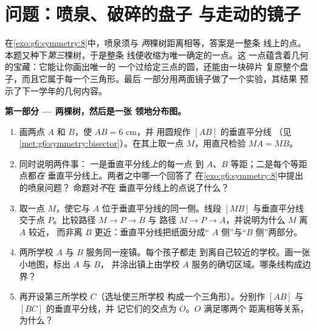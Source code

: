\section{问题：喷泉、破碎的盘子
与走动的镜子}

\begin{problem}
\label{pb:g6:symmetry:1}
在\cref{exo:g6:symmetry:8}中，喷泉须与
\emph{两}棵树距离相等，答案是一整条
线上的点。本题又种下\emph{第三}棵树，于是整条
线便收缩为唯一确定的一点。这
一点蕴含着几何的宝藏：它能让你画出唯一的
一个过给定三点的圆，还能由一块碎片
复原整个盘子，而且它属于每一个三角形。最后
一部分用两面镜子做了一个实验，其结果
预示了下一学年的几何内容。

\medskip
\noindent\textbf{第一部分 --- 两棵树，然后是一张
领地分布图。}
\begin{enumerate}
  \item 画两点 $A$ 和 $B$，使 $AB = 6$ cm，并
        用圆规作 $[AB]$ 的垂直平分线
        （见\cref{met:g6:symmetry:bisector}）。在其上取一点
        $M$，用直尺检验 $MA = MB$。
  \item {}同时说明两件事：
        一是垂直平分线\emph{上}的每一点
        到 $A$、$B$ 等距；二是每个等距点都\emph{在}
        垂直平分线上。两者之中哪一个回答了
        在\cref{exo:g6:symmetry:8}中提出的喷泉问题？
        命题对\emph{不}在
        垂直平分线上的点说了什么？
  \item 取一点 $M$，使它与
        $A$ 位于垂直平分线的同一侧。线段 $[MB]$ 与垂直平分线交于点
        $P$。比较路径 $M \to P \to B$ 与
        路径 $M \to P \to A$，并说明为什么 $M$ 离 $A$ 较近，
        而非离 $B$ 更近：垂直平分线把纸面分成“
        $A$ 侧”与“$B$ 侧”两部分。
  \item 两所学校 $A$ 与 $B$ 服务同一座镇。每个孩子都走
        到离自己较近的学校。画一张小地图，标出 $A$ 与 $B$，
        并涂出镇上由学校
        $A$ 服务的确切区域。哪条线构成边界？
  \item 再开设第三所学校 $C$（选址使三所学校
        构成一个三角形）。分别作
        $[AB]$ 与 $[BC]$ 的垂直平分线，并
        记它们的交点为 $O$。$O$ 满足哪两个
        距离相等关系，为什么？
\end{enumerate}


\end{problem}
